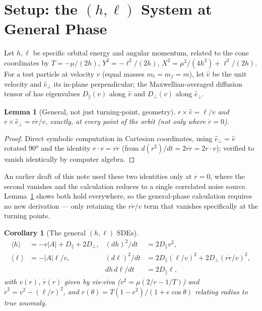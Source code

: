 \documentclass[12pt]{amsart}
\theoremstyle{plain}
\newtheorem{corollary}[theorem]{Corollary}
\newtheorem{lemma}[theorem]{Lemma}
\theoremstyle{remark}
\begin{document}
\begin{abstract}
that made the pointwise problem hardest --- fast encounters near periapsis of a near-parabolic orbit --- is revealed to be time-negligible, with the orbit average instead \emph{diverging} as $e\to1$ (like $(1-e)^{-1/2}$) rather than vanishing. This is not yet a complete proof of the secular statement, but it substantially outpaces the pointwise one.
\end{abstract}

\section{Setup: the $(h,\ell)$ System at General Phase}

Let $h,\ell$ be specific orbital energy and angular momentum, related to the cone coordinates by $T=-\mu/(2h)$, $Y^2=-\ell^2/(2h)$, $X^2=\mu^2/(4h^2)+\ell^2/(2h)$. For a test particle at velocity $v$ (equal masses $m_t=m_f=m$), let $\hat v$ be the unit velocity and $\hat e_\perp$ its in-plane perpendicular; the Maxwellian-averaged diffusion tensor of \cite{Ebert2026Rosenbluth} has eigenvalues $D_\parallel(v)$ along $\hat v$ and $D_\perp(v)$ along $\hat e_\perp$.

\begin{lemma}[General, not just turning-point, geometry]\label{lem:general}
$r\times\hat v = \ell/v$ and $r\times\hat e_\perp = r\dot r/v$, exactly, at every point of the orbit (not only where $\dot r=0$).
\end{lemma}

\begin{proof}
Direct symbolic computation in Cartesian coordinates, using $\hat e_\perp=\hat v$ rotated $90°$ and the identity $r\cdot v=r\dot r$ (from $d(r^2)/dt=2r\dot r=2r\cdot v$); verified to vanish identically by computer algebra.
\end{proof}

An earlier draft of this note used these two identities only at $\dot r=0$, where the second vanishes and the calculation reduces to a single correlated noise source. Lemma~\ref{lem:general} shows both hold everywhere, so the general-phase calculation requires no new derivation --- only retaining the $r\dot r/v$ term that vanishes specifically at the turning points.

\begin{corollary}[The general $(h,\ell)$ SDEs]\label{cor:general_sde}
\begin{align}
\langle\dot h\rangle &= -v|A|+D_\parallel+2D_\perp, & (dh)^2/dt &= 2D_\parallel v^2, \tag{1}\\
\langle\dot\ell\rangle &= -|A|\ell/v, & (d\ell)^2/dt &= 2D_\parallel(\ell/v)^2+2D_\perp(r\dot r/v)^2, \tag{2}\\
& & dh\,d\ell/dt &= 2D_\parallel\ell, \tag{3}
\end{align}
with $v(r)$, $\dot r(r)$ given by vis-viva ($v^2=\mu(2/r-1/T)$) and $\dot r^2=v^2-(\ell/r)^2$, and $r(\theta)=T(1-e^2)/(1+e\cos\theta)$ relating radius to true anomaly.
\end{corollary}
\end{document}

